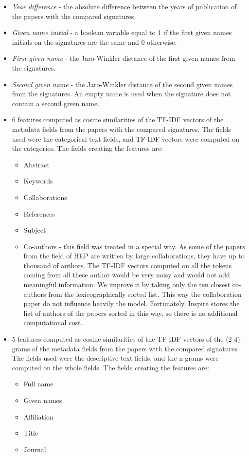 \documentclass{pracamgr}
\begin{document}
\begin{itemize}
\item{\textit{Year difference} - the absolute difference between the years of publication
of the papers with the compared signatures.}
\item{\textit{Given name initial} - a boolean variable equal to 1 if the first given
names initials on the signatures are the same and 0 otherwise.}
\item{\textit{First given name} - the Jaro-Winkler distance \citep{winkler} of the first
given names from the signatures.}
\item{\textit{Second given name} - the Jaro-Winkler distance \citep{winkler} of the second
given names from the signatures. An empty name is used when the signature does not
contain a second given name.}
\item{6 features computed as cosine similarities of the TF-IDF vectors of the
metadata fields from the papers with the compared signatures. The fields used were
the categorical text fields, and TF-IDF vectors were computed on the categories. The
fields creating the features are:

\begin{itemize}
\item{Abstract}
\item{Keywords}
\item{Collaborations}
\item{References}
\item{Subject}
\item{Co-authors - this field was treated in a special way. As some of the papers
from the field of HEP are written by large collaborations, they have up to
thousand of authors. The TF-IDF vectors computed on all the tokens
coming from all these author would be very noisy and would not add meaningful
information. We improve it by taking
only the ten closest co-authors from the lexicographically sorted list.
This way the collaboration paper do not influence heavily the model.
Fortunately, Inspire stores the list of authors of the papers sorted in this way,
so there is no additional computational cost.}
\end{itemize}}

\item{5 features computed as cosine similarities of the TF-IDF vectors of the
(2-4)-grams of the metadata fields from the papers with the compared signatures.
The fields used were the descriptive text fields, and the n-grams were
computed on the whole fields. The fields creating the features are:

\begin{itemize}
\item{Full name}
\item{Given names}
\item{Affiliation}
\item{Title}
\item{Journal}
\end{itemize}}

\end{itemize}
\end{document}
